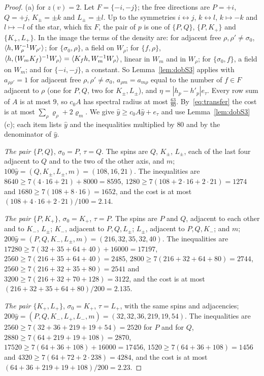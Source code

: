 \begin{proof}
(a) for $z(v)=2$. Let $F=\{-i,-j\}$; the free directions are $P=+i$, $Q=+j$,
$K_\pm=\pm k$ and $L_\pm=\pm l$. Up to the symmetries $i\leftrightarrow j$,
$k\leftrightarrow l$, $k\mapsto-k$ and $l\mapsto-l$ of the star, which fix
$F$, the pair of $p$ is one of $\{P,Q\}$, $\{P,K_+\}$ and $\{K_+,L_+\}$. In the
image the terms of the density are: for adjacent free $\rho,\rho'\ne\sigma_0$,
$\langle h,W_\rho^{-1}W_{\rho'}\rangle$; for $\{\sigma_0,\rho\}$, a field on $W_\rho$; for
$\{f,\rho\}$, $\langle h,(W_mK_f)^{-1}W_\rho\rangle=\langle K_fh,W_m^{-1}W_\rho\rangle$, linear in
$W_m$ and in $W_\rho$; for $\{\sigma_0,f\}$, a field on $W_m$; and for
$\{-i,-j\}$, a constant. So Lemma~\ref{lem:dobS3} applies with
$a_{\rho\rho'}=1$ for adjacent free $\rho,\rho'\ne\sigma_0$,
$a_{\rho m}=a_{m\rho}$ equal to the number of $f\in F$ adjacent to $\rho$
(one for $P,Q$, two for $K_\pm,L_\pm$), and $\eta=|h_p-h'_p|e_\tau$. Every row
sum of $A$ is at most $9$, so $c_0A$ has spectral radius at most
$\frac{63}{80}$. By~\eqref{eq:transfer} the cost is at most
$\sum_\rho\varrho_\rho+2\varrho_m$. We give $\hat y\ge c_0A\hat y+e_\tau$ and
use Lemma~\ref{lem:dobS3}(c); each item lists $\hat y$ and the inequalities
multiplied by $80$ and by the denominator of $\hat y$.

\emph{The pair $\{P,Q\}$}, $\sigma_0=P$, $\tau=Q$. The spins are $Q$, $K_\pm$,
$L_\pm$, each of the last four adjacent to $Q$ and to the two of the other
axis, and $m$; $100\hat y=(Q,K_\pm,L_\pm,m)=(108,16,21)$. The inequalities
are $8640\ge7(4\cdot16+21)+8000=8595$, $1280\ge7(108+2\cdot16+2\cdot21)=1274$
and $1680\ge7(108+8\cdot16)=1652$, and the cost is at most
$(108+4\cdot16+2\cdot21)/100=2.14$.

\emph{The pair $\{P,K_+\}$}, $\sigma_0=K_+$, $\tau=P$. The spins are $P$ and
$Q$, adjacent to each other and to $K_-$, $L_\pm$; $K_-$, adjacent to $P,Q,
L_\pm$; $L_\pm$, adjacent to $P,Q,K_-$; and $m$; $200\hat y=(P,Q,K_-,L_\pm,m)=
(216,32,35,32,40)$. The inequalities are $17280\ge7(32+35+64+40)+16000=17197$,
$2560\ge7(216+35+64+40)=2485$, $2800\ge7(216+32+64+80)=2744$,
$2560\ge7(216+32+35+80)=2541$ and $3200\ge7(216+32+70+128)=3122$, and the
cost is at most $(216+32+35+64+80)/200=2.135$.

\emph{The pair $\{K_+,L_+\}$}, $\sigma_0=K_+$, $\tau=L_+$, with the same spins
and adjacencies; $200\hat y=(P,Q,K_-,L_+,L_-,m)=(32,32,36,219,19,54)$. The
inequalities are $2560\ge7(32+36+219+19+54)=2520$ for $P$ and for $Q$,
$2880\ge7(64+219+19+108)=2870$, $17520\ge7(64+36+108)+16000=17456$,
$1520\ge7(64+36+108)=1456$ and $4320\ge7(64+72+2\cdot238)=4284$, and the cost
is at most $(64+36+219+19+108)/200=2.23$.


\end{proof}
